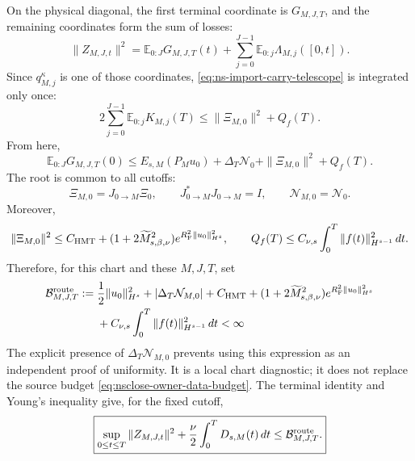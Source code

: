On the physical diagonal, the first terminal coordinate is \(G_{M,J,T}\), and the remaining coordinates form the sum of losses:
\begin{equation}
 \|Z_{M,J,t}\|^2
 =\mathbb E_{0:J}G_{M,J,T}(t)
 +\sum_{j=0}^{J-1}\mathbb E_{0:j}\Lambda_{M,j}([0,t]).
 \label{eq:ns-import-ledger}
\end{equation}
Since \(q_{M,j}^{\kappa}\) is one of those coordinates, \eqref{eq:ns-import-carry-telescope} is integrated only once:
\begin{equation}
 2\sum_{j=0}^{J-1}\mathbb E_{0:j}K_{M,j}(T)
 \le\|\Xi_{M,0}\|^2+Q_f(T).
 \label{eq:ns-import-carry-funded}
\end{equation}
From here,
\begin{equation}
 \mathbb E_{0:J}G_{M,J,T}(0)
 \le E_{s,M}(P_Mu_0)
 +\Delta_T\mathcal N_0+\|\Xi_{M,0}\|^2+Q_f(T).
 \label{eq:ns-import-root-bound}
\end{equation}
The root is common to all cutoffs:
\begin{equation}
 \Xi_{M,0}=J_{0\to M}\Xi_0,
 \qquad J_{0\to M}^*J_{0\to M}=I,
 \qquad \mathcal N_{M,0}=\mathcal N_0.
 \label{eq:ns-import-common-root}
\end{equation}
Moreover,
\begin{equation}
 \|\Xi_{M,0}\|^2
 \le C_{\rm HMT}
 +(1+2\widetilde M_{s,\beta,\nu}^2)
 e^{R_{\rm F}^2\|u_0\|_{H^s}^2},
 \qquad
 Q_f(T)\le C_{\nu,s}\int_0^T\|f(t)\|_{H^{s-1}}^2\,dt.
 \label{eq:ns-import-root-data-bound}
\end{equation}
Therefore, for this chart and these \(M,J,T\), set
\begin{align}
 \mathcal B_{M,J,T}^{\rm route}:={}&
 \frac12\|u_0\|_{H^s}^2
 +|\Delta_T\mathcal N_{M,0}|+C_{\rm HMT}
 +(1+2\widetilde M_{s,\beta,\nu}^2)
 e^{R_{\rm F}^2\|u_0\|_{H^s}^2}\notag\\
 &+C_{\nu,s}\int_0^T\|f(t)\|_{H^{s-1}}^2\,dt
 <\infty
 \label{eq:ns-import-explicit-budget}
\end{align}
The explicit presence of \(\Delta_T\mathcal N_{M,0}\) prevents using this expression as an independent proof of uniformity. It is a local chart diagnostic; it does not replace the source budget \eqref{eq:nsclose-owner-data-budget}. The terminal identity and Young's inequality give, for the fixed cutoff,
\begin{equation}
 \boxed{
 \sup_{0\le t\le T}\|Z_{M,J,t}\|^2
 +\frac{\nu}{2}\int_0^TD_{s,M}(t)\,dt
 \le\mathcal B_{M,J,T}^{\rm route}.}
 \label{eq:ns-import-uniform-budget}
\end{equation}

